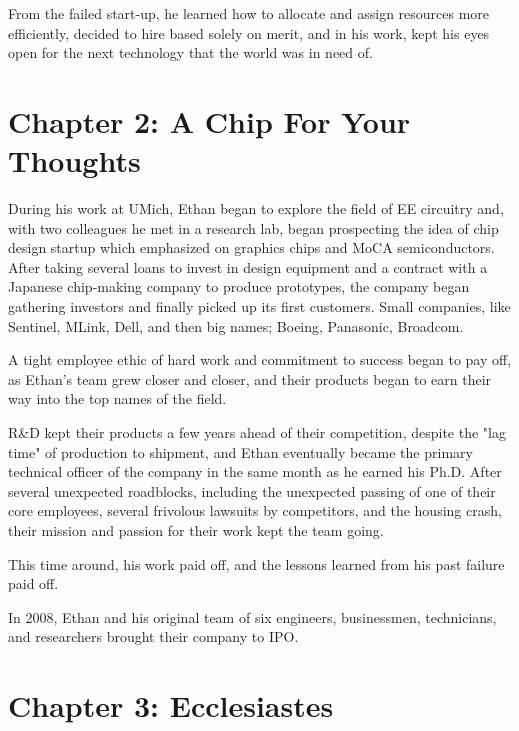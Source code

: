 \documentclass[a4paper,12pt,twoside]{book}
\begin{document}
From the failed start-up, he learned how to allocate and assign resources more efficiently, decided to hire based solely on merit, and in his work, kept his eyes open for the next technology that the world was in need of.


\chapter{Chapter 2: A Chip For Your Thoughts}

During his work at UMich,  Ethan began to explore the field of EE circuitry and, with two colleagues he met in a research lab, began prospecting the idea of chip design startup which emphasized on graphics chips and MoCA semiconductors.  After taking several loans to invest in design equipment and a contract with a Japanese chip-making company to produce prototypes, the company began gathering investors and finally picked up its first customers.  Small companies, like Sentinel, MLink, Dell, and then big names; Boeing, Panasonic, Broadcom.

A tight employee ethic of hard work and commitment to success began to pay off, as Ethan's team grew closer and closer, and their products began to earn their way into the top names of the field.  

R&D kept their products a few years ahead of their competition, despite the "lag time" of production to shipment, and Ethan eventually became the primary technical officer of the company in the same month as he earned his Ph.D.  After several unexpected roadblocks, including the unexpected passing of one of their core employees, several frivolous lawsuits by competitors, and the housing crash, their mission and passion for their work kept the team going.  

This time around, his work paid off, and the lessons learned from his past failure paid off. 

In 2008, Ethan and his original team of six engineers, businessmen, technicians, and researchers brought their company to IPO. 


\chapter{Chapter 3: Ecclesiastes}
\end{document}
